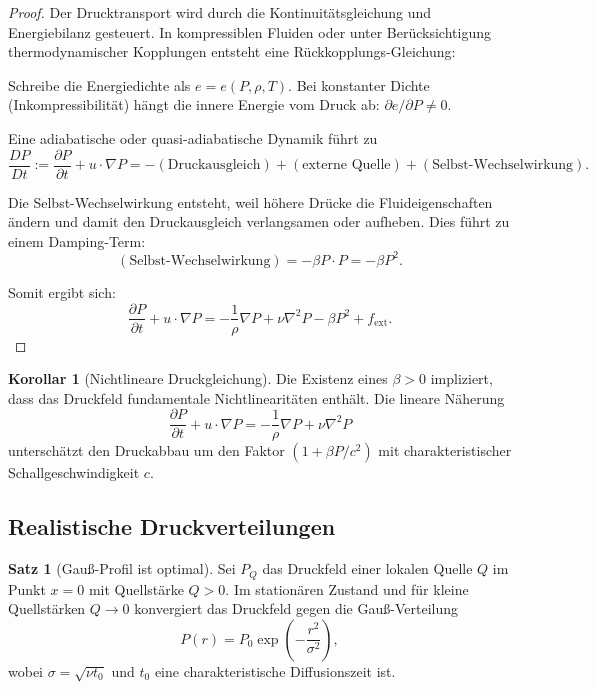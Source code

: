 \documentclass[a4paper,12pt]{article}
\theoremstyle{definition}
\newtheorem{satz}{Satz}
\newtheorem{korollar}{Korollar}
\begin{document}
\begin{proof}
Der Drucktransport wird durch die Kontinuitätsgleichung und Energiebilanz gesteuert. In kompressiblen Fluiden oder unter Berücksichtigung thermodynamischer Kopplungen entsteht eine Rückkopplungs-Gleichung:

Schreibe die Energiedichte als $e = e(P, \rho, T)$. Bei konstanter Dichte (Inkompressibilität) hängt die innere Energie vom Druck ab: $\partial e / \partial P \neq 0$.

Eine adiabatische oder quasi-adiabatische Dynamik führt zu
\[
\frac{D P}{D t} := \frac{\partial P}{\partial t} + u \cdot \nabla P = -(\text{Druckausgleich}) + (\text{externe Quelle}) + (\text{Selbst-Wechselwirkung}).
\]

Die Selbst-Wechselwirkung entsteht, weil höhere Drücke die Fluideigenschaften ändern und damit den Druckausgleich verlangsamen oder aufheben. Dies führt zu einem Damping-Term:
\[
(\text{Selbst-Wechselwirkung}) = -\beta P \cdot P = -\beta P^2.
\]

Somit ergibt sich:
\[
\frac{\partial P}{\partial t} + u \cdot \nabla P = -\frac{1}{\rho} \nabla P + \nu \nabla^2 P - \beta P^2 + f_{\text{ext}}.
\]
\end{proof}

\begin{korollar}[Nichtlineare Druckgleichung]
Die Existenz eines $\beta > 0$ impliziert, dass das Druckfeld fundamentale Nichtlinearitäten enthält. Die lineare Näherung
\[
\frac{\partial P}{\partial t} + u \cdot \nabla P = -\frac{1}{\rho} \nabla P + \nu \nabla^2 P
\]
unterschätzt den Druckabbau um den Faktor $(1 + \beta P / c^2)$ mit charakteristischer Schallgeschwindigkeit $c$.
\end{korollar}

\subsection{Realistische Druckverteilungen}

\begin{satz}[Gauß-Profil ist optimal]
\label{satz:gaussian-optimal}
Sei $P_Q$ das Druckfeld einer lokalen Quelle $Q$ im Punkt $x=0$ mit Quellstärke $Q > 0$. Im stationären Zustand und für kleine Quellstärken $Q \to 0$ konvergiert das Druckfeld gegen die Gauß-Verteilung
\[
P(r) = P_0 \exp\left(-\frac{r^2}{\sigma^2}\right),
\]
wobei $\sigma = \sqrt{\nu t_0}$ und $t_0$ eine charakteristische Diffusionszeit ist.
\end{satz}
\end{document}
